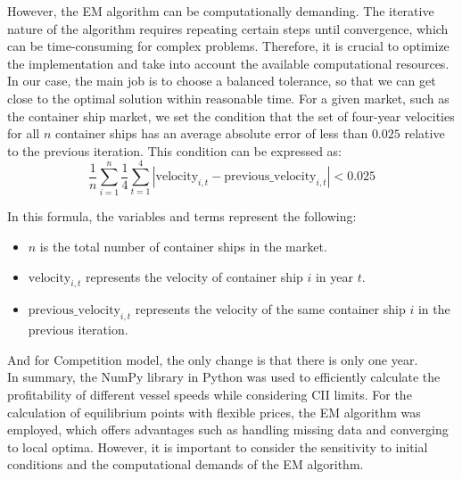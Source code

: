 \documentclass[a4paper,12pt]{article}
\begin{document}

However, the EM algorithm can be computationally demanding.
The iterative nature of the algorithm requires repeating certain steps until convergence, which can be time-consuming for complex problems.
Therefore, it is crucial to optimize the implementation and take into account the available computational resources.
In our case, the main job is to choose a balanced tolerance, so that we can get close to the optimal solution within reasonable time.
For a given market, such as the container ship market, we set the condition that the set of four-year velocities for all $n$ container ships has an average absolute error of less than $0.025$ relative to the previous iteration.
This condition can be expressed as:
\begin{equation}
	\frac{1}{n}\sum_{i=1}^{n} \frac{1}{4} \sum_{t=1}^{4} \left| \text{velocity}_{i,t} - \text{previous\_velocity}_{i,t} \right| < 0.025
\end{equation}

In this formula, the variables and terms represent the following:
\begin{itemize}
	\item $n$ is the total number of container ships in the market.
	\item $\text{velocity}_{i,t}$ represents the velocity of container ship $i$ in year $t$.
	\item $\text{previous\_velocity}_{i,t}$ represents the velocity of the same container ship $i$ in the previous iteration.
\end{itemize}

And for Competition model, the only change is that there is only one year.\\

In summary, the NumPy library in Python was used to efficiently calculate the profitability of different vessel speeds while considering CII limits.
For the calculation of equilibrium points with flexible prices, the EM algorithm was employed, which offers advantages such as handling missing data and converging to local optima.
However, it is important to consider the sensitivity to initial conditions and the computational demands of the EM algorithm.\\
\end{document}
